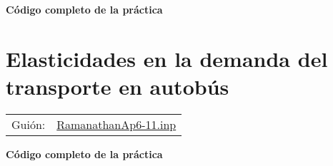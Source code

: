 \documentclass[11pt]{article}
\begin{document}
\vspace{10pt}
\noindent
\textbf{Código completo de la práctica}
\vspace{10pt}

\clearpage

\section{Elasticidades en la demanda del transporte en autobús}
\label{sec:orgd0e7044}
\begin{center}
\begin{tabular}{ll}
Guión: & \href{https://github.com/mbujosab/Ectr/tree/master/Practicas/Gretl/scripts/RamanathanAp6-11.inp}{RamanathanAp6-11.inp}\\
\end{tabular}
\end{center}

\vspace{10pt}
\noindent
\textbf{Código completo de la práctica}
\vspace{10pt}

\clearpage
\end{document}
